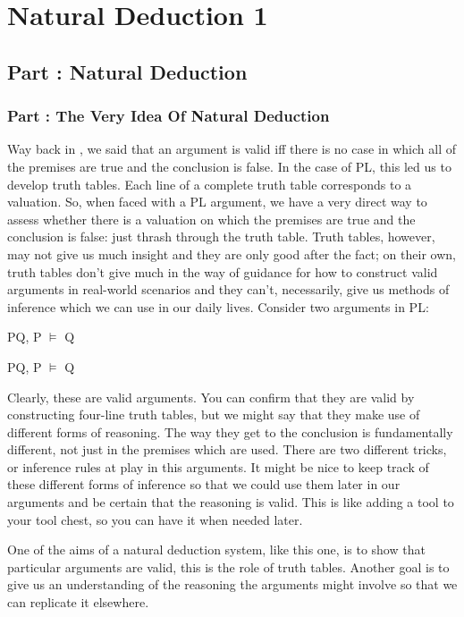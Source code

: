 \part{Natural Deduction 1}
\label{ch.plnd1}
\setcounter{seccount}{1}
\chapter{Part \thechapcount: Natural Deduction}
\section{Part \thechapcount: The Very Idea Of Natural Deduction}
Way back in , we said that an argument is valid iff there is no case in which all of the premises are true and the conclusion is false. In the case of PL, this led us to develop truth tables. Each line of a complete truth table corresponds to a valuation. So, when faced with a PL argument, we have a very direct way to assess whether there is a valuation on which the premises are true and the conclusion is false: just thrash through the truth table. Truth tables, however, may not give us much insight and they are only good after the fact; on their own, truth tables don't give much in the way of guidance for how to construct valid arguments in real-world scenarios and they can't, necessarily, give us methods of inference which we can use in our daily lives. Consider two arguments in PL:
\begin{earg}
\item[]P\eor Q, \enot P $\vDash$ Q
\item[]P\eif Q, P $\vDash$ Q
\end{earg}
Clearly, these are valid arguments. You can confirm that they are valid by constructing four-line truth tables, but we might say that they make use of different forms of reasoning. The way they get to the conclusion is fundamentally different, not just in the premises which are used. There are two different tricks, or inference rules at play in this arguments. It might be nice to keep track of these different forms of inference so that we could use them later in our arguments and be certain that the reasoning is valid. This is like adding a tool to your tool chest, so you can have it when needed later.

One of the aims of a natural deduction system, like this one, is to show that particular arguments are valid, this is the role of truth tables. Another goal is to give us an understanding of the reasoning the arguments might involve so that we can replicate it elsewhere.

